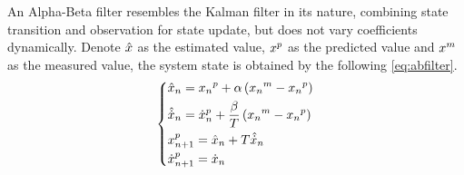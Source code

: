 An Alpha-Beta filter resembles the Kalman filter in its nature, combining state transition and observation for state update, but does not vary coefficients dynamically. Denote $\hat{\boldmath{x}}$ as the estimated value, $\boldmath{x}^p$ as the predicted value and $\boldmath{x}^m$ as the measured value, the system state is obtained by the following \autoref{eq:abfilter}.
\begin{equation}\label{eq:abfilter}
  \left\{
  \begin{split}
    & \hat{\boldmath{x}}_n = \boldmath{x_n}^p + \alpha\left(\boldmath{x_n}^m-\boldmath{x_n}^p\right)\\
    & \hat{\boldmath{\dot{x}}}_n = \boldmath{\dot{x}}^p_n + \frac{\beta}{T}\left(\boldmath{x_n}^m-\boldmath{x_n}^p\right)\\
    & \boldmath{x_{n+1}^p} = \hat{\boldmath{x}}_n + T \hat{\boldmath{\dot{x}}}_n\\
    & \boldmath{\dot{x}_{n+1}}^p = \boldmath{\dot{x}_{n}}
  \end{split}
  \right.
\end{equation}

